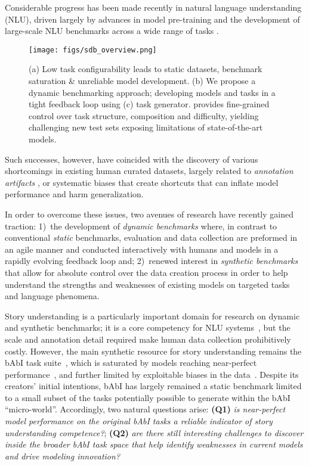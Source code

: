 Considerable progress has been made recently in natural language understanding (NLU), driven largely by advances in model pre-training \cite{devlin-etal-2019-bert,2020t5}  and the development of large-scale NLU benchmarks across a wide range of tasks \cite{wang-etal-2018-glue,wang2019superglue,liang-etal-2020-xglue}.
\begin{figure}[t!]
\centering
\texttt{[image: figs/sdb\_overview.png]}

\caption{\label{fig:sdb-overview}
(a) Low task configurability leads to static datasets, benchmark saturation \& unreliable model development. (b) We propose a dynamic benchmarking approach; developing models and tasks in a tight feedback loop using (c) \pybabi task generator. \pybabi provides fine-grained control over task structure, composition and difficulty, yielding challenging new test sets exposing limitations of state-of-the-art models.}
\end{figure}
Such successes, however, have coincided with the discovery of various shortcomings in existing human curated datasets, largely related to \emph{annotation artifacts} \citep{gururangan-etal-2018-annotation}, or systematic biases that create shortcuts that can inflate model performance and harm generalization. 

In order to overcome these issues, two avenues of research have recently gained traction: 1)~the development of \emph{dynamic benchmarks} \cite{potts-etal-2021-dynasent,kiela2021dynabench} where, in contrast to conventional \emph{static} benchmarks, evaluation and data collection are preformed in an agile manner and conducted interactively with humans and models in a rapidly evolving feedback loop and; 2)~renewed interest in  \emph{synthetic benchmarks} \cite{lake2018generalization,sinha-etal-2019-clutrr,clark2020transformers,ruis2020benchmark} that allow for absolute control over the data creation process in order to help understand the strengths and weaknesses of existing models on targeted tasks and language phenomena. 




Story understanding is a particularly important domain for research on dynamic and synthetic benchmarks; it is a core competency for NLU systems~\citep{McClelland2020,dunietz-etal-2020-test}, but the scale and annotation detail required make human data collection prohibitively costly. However, the main synthetic resource for story understanding remains the bAbI task suite~\citep{babi2016}, which is saturated by models reaching near-perfect performance~\citep{liu2021small}, and further limited by exploitable biases in the data~\citep{kaushik-lipton-2018-much}. Despite its creators' initial intentions, bAbI has largely remained a static benchmark limited to a small subset of the tasks potentially possible to generate within the bAbI ``micro-world''. Accordingly, two natural questions arise: \textbf{(Q1)} \emph{is near-perfect model performance on the original bAbI tasks a reliable indicator of story understanding competence?}; \textbf{(Q2)} \emph{are there still interesting challenges to discover inside the broader bAbI task space that help identify weaknesses in current models and drive modeling innovation?}


